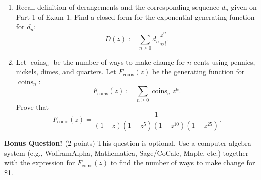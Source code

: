 \documentclass[11pt]{article}
\theoremstyle{definition}
\DeclareMathOperator{\Inv}{Inv}
\DeclareMathOperator{\tr}{tr}
\DeclareMathOperator{\pk}{pk}
\DeclareMathOperator{\coins}{coins}
\DeclareMathOperator{\Dyck}{Dyck}
\begin{document}
\begin{enumerate}
\begin{enumerate}
\item Recall definition of derangements and the corresponding sequence $d_n$ given on Part 1 of Exam 1. Find a closed form for the exponential generating function for $d_n$:
\[
D(z):=\sum_{n\geq 0}d_n\frac{z^n}{n!}.
\]

\item Let $\coins_n$ be the number of ways to make change for $n$ cents using pennies, nickels, dimes, and quarters. Let $F_{\coins}(z)$ be the generating function for $\coins_n$:
\[
F_{\coins}(z):=\sum_{n\geq 0}\coins_nz^n.
\]
Prove that 
\[
F_{\coins}(z)=\frac{1}{(1-z)(1-z^5)(1-z^{10})(1-z^{25})}.
\]

\end{enumerate}

\end{enumerate}

\textbf{Bonus Question!} (2 points) This question is optional.  Use a computer algebra system (e.g., WolframAlpha, Mathematica, Sage/CoCalc, Maple, etc.) together with the expression for $F_{\coins}(z)$ to find the number of ways to make change for \$1.






\end{document}
